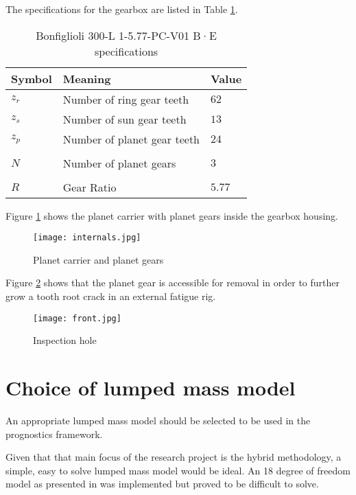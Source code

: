 \documentclass[]{article}
\begin{document}
	The specifications for the gearbox are listed in Table \ref{t:Bonfiglioli}.
	
	\begin{table}[H]
		\centering
		\caption{Bonfiglioli 300-L 1-5.77-PC-V01 B·E specifications}
		\label{t:Bonfiglioli}
		\begin{tabular}{@{}lll@{}}
			\toprule
			Symbol & Meaning & Value \\ \midrule
			$z_r$ & Number of ring gear teeth & $62$ \\
			$z_s$ & Number of sun gear teeth & $13$ \\
			$z_p$ & Number of planet gear teeth & $24$ \\
			&  &  \\
			$N$ & Number of planet gears & $3$ \\
			&  &  \\
			$R$& Gear Ratio  & $5.77$  \\\bottomrule
		\end{tabular}
	\end{table}
	
	\vspace{1cm}
	
	Figure \ref{f:internals} shows the planet carrier with planet gears inside the gearbox housing.
	
	\begin{figure}[H]
		\texttt{[image: internals.jpg]}
		\caption{Planet carrier and planet gears}
		\label{f:internals}
	\end{figure}
	
	
	
	Figure \ref{f:inspect} shows that the planet gear is accessible for removal in order to further grow a tooth root crack in an external fatigue rig.
	
	\begin{figure}[H]
		\texttt{[image: front.jpg]}
		\caption{Inspection hole}
		\label{f:inspect}
	\end{figure}
	
	
	\section*{Choice of lumped mass model}
	
	An appropriate lumped mass model should be selected to be used in the prognostics framework.
	
	Given that that main focus of the research project is the hybrid methodology, a simple, easy to solve lumped mass model would be ideal. An 18 degree of freedom model as presented in \cite{Chaari2006} was implemented but proved to be difficult to solve. 
	
	
	
	
	
	
\end{document}
